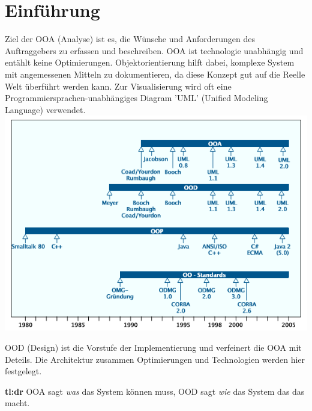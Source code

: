 \section{Einführung}
Ziel der OOA (Analyse) ist es, die Wünsche und Anforderungen des Auftraggebers zu erfassen und beschreiben. OOA ist technologie unabhängig und entählt keine Optimierungen. Objektorientierung hilft dabei, komplexe System mit angemessenen Mitteln zu dokumentieren, da diese Konzept gut auf die Reelle Welt überführt werden kann. Zur Visualisierung wird oft eine Programmiersprachen-unabhängiges Diagram 'UML' (Unified Modeling Language) verwendet.\\
\includegraphics[width=\columnwidth]{Images/geschichte}


OOD (Design) ist die Vorstufe der Implementierung und verfeinert die OOA mit Deteils. Die Architektur zusammen Optimierungen und Technologien werden hier festgelegt.

\textbf{tl:dr} OOA sagt \textit{was} das System können muss, OOD sagt \textit{wie} das System das das macht. 